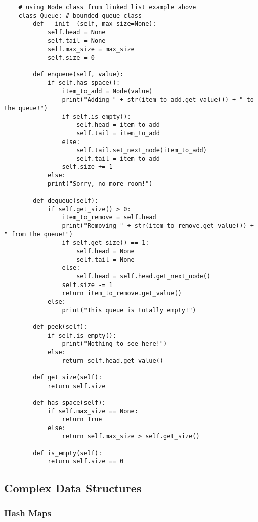 \documentclass[11pt, a4paper]{article}
\begin{document}
\begin{spacing}{1.1}
	\begin{lstlisting}
	# using Node class from linked list example above
	class Queue: # bounded queue class
		def __init__(self, max_size=None):
			self.head = None
			self.tail = None
			self.max_size = max_size
			self.size = 0
		
		def enqueue(self, value):
			if self.has_space():
				item_to_add = Node(value)
				print("Adding " + str(item_to_add.get_value()) + " to the queue!")
				if self.is_empty():
					self.head = item_to_add
					self.tail = item_to_add
				else:
					self.tail.set_next_node(item_to_add)
					self.tail = item_to_add
				self.size += 1
			else:
			print("Sorry, no more room!")
		    
		def dequeue(self):
			if self.get_size() > 0:
				item_to_remove = self.head
				print("Removing " + str(item_to_remove.get_value()) + " from the queue!")
				if self.get_size() == 1:
					self.head = None
					self.tail = None
				else:
					self.head = self.head.get_next_node()
				self.size -= 1
				return item_to_remove.get_value()
			else:
				print("This queue is totally empty!")
		
		def peek(self):
			if self.is_empty():
				print("Nothing to see here!")
			else:
				return self.head.get_value()
		
		def get_size(self):
			return self.size
		
		def has_space(self):
			if self.max_size == None:
				return True
			else:
				return self.max_size > self.get_size()
		
		def is_empty(self):
			return self.size == 0 \end{lstlisting} \newpage
	
	\subsection{Complex Data Structures}
	\subsubsection{Hash Maps}
	
	
	
	
	
	
	
	
	
	
	
	
	
\end{spacing}
\end{document}
